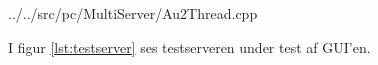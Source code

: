 
{../../src/pc/MultiServer/Au2Thread.cpp}

%
%
%
I figur \ref{lst:testserver} ses testserveren under test af GUI'en. 


